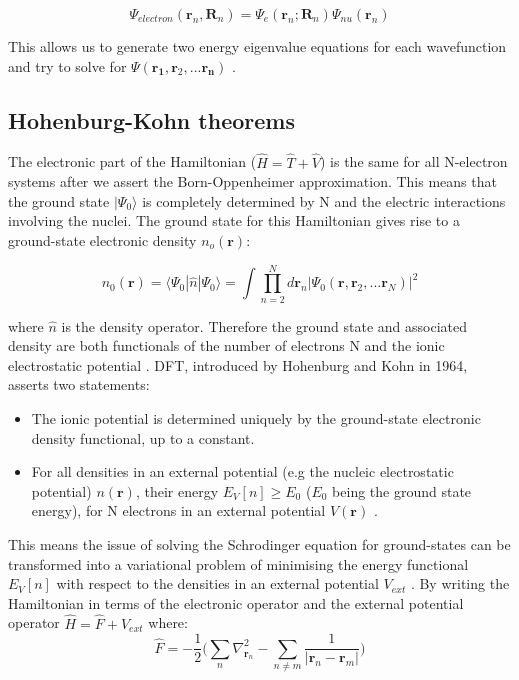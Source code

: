 \documentclass[10pt]{article}
\begin{document}
\begin{equation*}
	\Psi_{electron}(\textbf{r}_n,\textbf{R}_n) =  \Psi_e(\textbf{r}_n;\textbf{R}_n)\Psi_{nu}(\textbf{r}_{n})
\end{equation*}

This allows us to generate two energy eigenvalue equations for each wavefunction and try to solve for $\Psi(\mathbf{r_1},\mathbf{r}_2,...\mathbf{r_n})$ \cite{rebolini2014range}. 

\subsection{Hohenburg-Kohn theorems}

The electronic part of the Hamiltonian ($\hat{H}=\hat{T}+\hat{V}$) is the same for all N-electron systems after we assert the Born-Oppenheimer approximation. This means that the ground state $|\Psi_0\rangle$ is completely determined by N and the electric interactions involving the nuclei. The ground state for this Hamiltonian gives rise to a ground-state electronic density $n_o(\mathbf{r})$:

\begin{equation*}
	n_0(\mathbf{r})=\langle\Psi_0|\hat{n}|\Psi_0\rangle = \int\prod_{n=2}^{N}d\mathbf{r}_n|\Psi_0(\mathbf{r},\mathbf{r}_2,...\mathbf{r}_N)|^2
\end{equation*}

where $\hat{n}$ is the density operator. Therefore the ground state and associated density are both functionals of the number of electrons N and the ionic electrostatic potential . DFT, introduced by Hohenburg and Kohn in 1964, asserts two statements:

\begin{itemize}
	\item The ionic potential is determined uniquely by the ground-state electronic density functional, up to a constant.
	\item For all densities in an external potential (e.g the nucleic electrostatic potential) $n(\mathbf{r})$, their energy $E_V[n]\geq E_0$ ($E_0$ being the ground state energy), for N electrons in an external potential $V(\mathbf{r})$ \cite{haynes}. 
\end{itemize}

This means the issue of solving the Schrodinger equation for ground-states can be transformed into a variational problem of minimising the energy functional $E_V[n]$ with respect to the densities in an external potential $V_{ext}$ \cite{hohenberg1964inhomogeneous}. By writing the Hamiltonian in terms of the electronic operator and the external potential operator $\hat{H} = \hat{F}+\hat{V}_{ext}$ where: $$\hat{F} = -\frac{1}{2}\biggr(\sum_n\nabla^2_{\textbf{r}_n}-\sum_{n\not=m}\frac{1}{|\textbf{r}_n-\textbf{r}_m|}\biggr)$$
\end{document}
